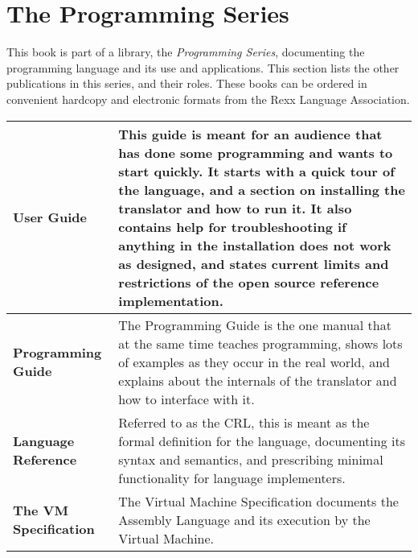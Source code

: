 \chapter{The \crexx{} Programming Series}
This book is part of a library, the \emph{\crexx{} Programming Series}, documenting the \crexx{} programming language and its use and applications. This section lists the other publications in this series, and their roles. These books can be ordered in convenient hardcopy and electronic formats from the Rexx Language Association.
\newline
\newline
\begin{tabularx}{\textwidth}{>{\bfseries}lX}
\toprule
User Guide & This guide is meant for an audience that has done some programming and wants to start quickly. It starts with a quick tour of the language, and a section on installing the \crexx{} translator and how to run it. It also contains help for troubleshooting if anything in the installation does not work as designed, and states current limits and restrictions of the open source reference implementation.
\\\midrule
Programming Guide & The Programming Guide is the one manual that at the same time teaches programming, shows lots of examples as they occur in the real world, and explains about the internals of the translator and how to interface with it.
\\\midrule
Language Reference & Referred to as the CRL, this is meant as the formal definition for the language, documenting its syntax and semantics, and prescribing minimal functionality for language implementers.
\\\midrule
The \crexx{} VM Specification & The \crexx{} Virtual Machine
Specification documents the \crexx{} Assembly Language and its execution
by the \crexx{} Virtual Machine.
\\\bottomrule
\end{tabularx}
